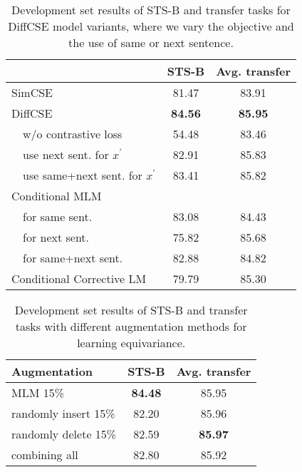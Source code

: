 \documentclass[11pt]{article}
\newcommand\tf[1]{\textbf{#1}}
\begin{document}
\begin{table}[t!]
    \begin{center}
    \centering
    \small
    \begin{tabular}{lcc}
    \toprule
         & \tf{STS-B} & \tf{Avg. transfer} \\
    \midrule
        SimCSE & 81.47 & 83.91 \\
    \midrule
        DiffCSE & \bf 84.56 & \bf 85.95\\
        ~~w/o contrastive loss & 54.48 & 83.46 \\
        ~~use next sent. for $x^{\prime}$ & 82.91 & 85.83 \\
        ~~use same+next sent. for $x^{\prime}$ & 83.41 & 85.82 \\
    \midrule
        Conditional MLM & & \\
        ~~for same sent. & 83.08 & 84.43 \\
        ~~for next sent. & 75.82 & 85.68 \\
        ~~for same+next sent. & 82.88 & 84.82 \\
    \midrule
        Conditional Corrective LM & 79.79 & 85.30 \\
    \bottomrule
    \end{tabular}
    \end{center}
\vspace{-3mm}
    \caption{
        Development set results of STS-B and transfer tasks for DiffCSE model variants, where we vary the objective and the use of same or next sentence.
    }
    \label{tab:ablation}
\vspace{-2mm}
\end{table}

\begin{table}[ht]
\centering
\small
\setlength\tabcolsep{3pt}
\begin{tabular}{lcc}
\toprule
\bf Augmentation               & \bf STS-B & \multicolumn{1}{c}{\bf Avg. transfer} \\
\midrule

MLM 15\%                   & \bf 84.48 & 85.95                                    \\
randomly insert 15\%         & 82.20 & 85.96                                    \\
randomly delete 15\%         & 82.59 & \bf 85.97                                    \\
combining all              & 82.80 & 85.92 \\
\bottomrule

\end{tabular}
\vspace{-2mm}
\caption{Development set results of STS-B and transfer tasks with different augmentation methods for learning equivariance.}
\label{tab:augments}
\vspace{-4mm}
\end{table}
\end{document}
